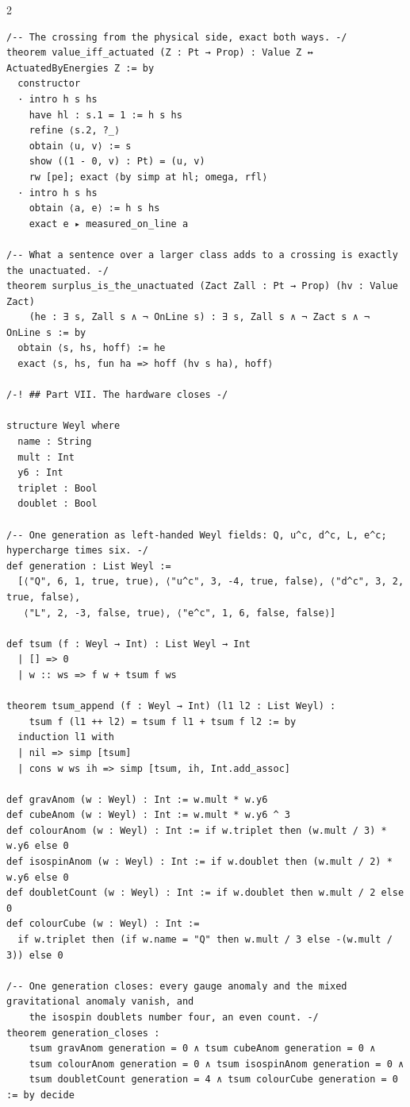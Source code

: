 \documentclass[10pt]{article}
\begin{document}
\begin{multicols}{2}
\begin{Verbatim}[fontsize=\fontsize{6.2}{7.2}\selectfont,breaklines,breakanywhere,breaksymbolleft={}]
/-- The crossing from the physical side, exact both ways. -/
theorem value_iff_actuated (Z : Pt → Prop) : Value Z ↔ ActuatedByEnergies Z := by
  constructor
  · intro h s hs
    have hl : s.1 = 1 := h s hs
    refine ⟨s.2, ?_⟩
    obtain ⟨u, v⟩ := s
    show ((1 - 0, v) : Pt) = (u, v)
    rw [pe]; exact ⟨by simp at hl; omega, rfl⟩
  · intro h s hs
    obtain ⟨a, e⟩ := h s hs
    exact e ▸ measured_on_line a

/-- What a sentence over a larger class adds to a crossing is exactly the unactuated. -/
theorem surplus_is_the_unactuated (Zact Zall : Pt → Prop) (hv : Value Zact)
    (he : ∃ s, Zall s ∧ ¬ OnLine s) : ∃ s, Zall s ∧ ¬ Zact s ∧ ¬ OnLine s := by
  obtain ⟨s, hs, hoff⟩ := he
  exact ⟨s, hs, fun ha => hoff (hv s ha), hoff⟩

/-! ## Part VII. The hardware closes -/

structure Weyl where
  name : String
  mult : Int
  y6 : Int
  triplet : Bool
  doublet : Bool

/-- One generation as left-handed Weyl fields: Q, u^c, d^c, L, e^c; hypercharge times six. -/
def generation : List Weyl :=
  [⟨"Q", 6, 1, true, true⟩, ⟨"u^c", 3, -4, true, false⟩, ⟨"d^c", 3, 2, true, false⟩,
   ⟨"L", 2, -3, false, true⟩, ⟨"e^c", 1, 6, false, false⟩]

def tsum (f : Weyl → Int) : List Weyl → Int
  | [] => 0
  | w :: ws => f w + tsum f ws

theorem tsum_append (f : Weyl → Int) (l1 l2 : List Weyl) :
    tsum f (l1 ++ l2) = tsum f l1 + tsum f l2 := by
  induction l1 with
  | nil => simp [tsum]
  | cons w ws ih => simp [tsum, ih, Int.add_assoc]

def gravAnom (w : Weyl) : Int := w.mult * w.y6
def cubeAnom (w : Weyl) : Int := w.mult * w.y6 ^ 3
def colourAnom (w : Weyl) : Int := if w.triplet then (w.mult / 3) * w.y6 else 0
def isospinAnom (w : Weyl) : Int := if w.doublet then (w.mult / 2) * w.y6 else 0
def doubletCount (w : Weyl) : Int := if w.doublet then w.mult / 2 else 0
def colourCube (w : Weyl) : Int :=
  if w.triplet then (if w.name = "Q" then w.mult / 3 else -(w.mult / 3)) else 0

/-- One generation closes: every gauge anomaly and the mixed gravitational anomaly vanish, and
    the isospin doublets number four, an even count. -/
theorem generation_closes :
    tsum gravAnom generation = 0 ∧ tsum cubeAnom generation = 0 ∧
    tsum colourAnom generation = 0 ∧ tsum isospinAnom generation = 0 ∧
    tsum doubletCount generation = 4 ∧ tsum colourCube generation = 0 := by decide


\end{Verbatim}
\end{multicols}
\end{document}
